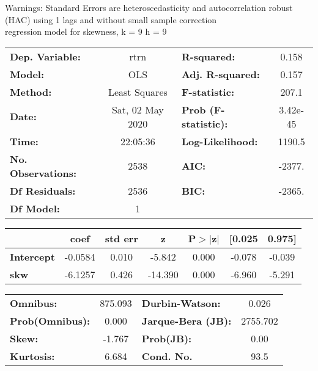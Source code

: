 Warnings: \newline
 [1] Standard Errors are heteroscedasticity and autocorrelation robust (HAC) using 1 lags and without small sample correction\\ 

regression model for skewness, k = 9 h = 9\begin{center}
\begin{tabular}{lclc}
\toprule
\textbf{Dep. Variable:}    &       rtrn       & \textbf{  R-squared:         } &     0.158   \\
\textbf{Model:}            &       OLS        & \textbf{  Adj. R-squared:    } &     0.157   \\
\textbf{Method:}           &  Least Squares   & \textbf{  F-statistic:       } &     207.1   \\
\textbf{Date:}             & Sat, 02 May 2020 & \textbf{  Prob (F-statistic):} &  3.42e-45   \\
\textbf{Time:}             &     22:05:36     & \textbf{  Log-Likelihood:    } &    1190.5   \\
\textbf{No. Observations:} &        2538      & \textbf{  AIC:               } &    -2377.   \\
\textbf{Df Residuals:}     &        2536      & \textbf{  BIC:               } &    -2365.   \\
\textbf{Df Model:}         &           1      & \textbf{                     } &             \\
\bottomrule
\end{tabular}
\begin{tabular}{lcccccc}
                   & \textbf{coef} & \textbf{std err} & \textbf{z} & \textbf{P$> |$z$|$} & \textbf{[0.025} & \textbf{0.975]}  \\
\midrule
\textbf{Intercept} &      -0.0584  &        0.010     &    -5.842  &         0.000        &       -0.078    &       -0.039     \\
\textbf{skw}       &      -6.1257  &        0.426     &   -14.390  &         0.000        &       -6.960    &       -5.291     \\
\bottomrule
\end{tabular}
\begin{tabular}{lclc}
\textbf{Omnibus:}       & 875.093 & \textbf{  Durbin-Watson:     } &    0.026  \\
\textbf{Prob(Omnibus):} &   0.000 & \textbf{  Jarque-Bera (JB):  } & 2755.702  \\
\textbf{Skew:}          &  -1.767 & \textbf{  Prob(JB):          } &     0.00  \\
\textbf{Kurtosis:}      &   6.684 & \textbf{  Cond. No.          } &     93.5  \\
\bottomrule
\end{tabular}
\end{center}

